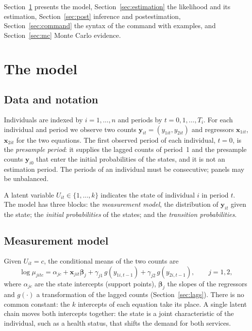 \documentclass[11pt,a4paper]{article}
\newcommand{\yv}{\mathbf y}
\newcommand{\xv}{\mathbf x}
\begin{document}
Section~\ref{sec:model} presents the model, Section~\ref{sec:estimation} the likelihood and its
estimation, Section~\ref{sec:post} inference and postestimation, Section~\ref{sec:command} the
syntax of the command with examples, and Section~\ref{sec:mc} Monte Carlo evidence.

\section{The model}\label{sec:model}

\subsection{Data and notation}

Individuals are indexed by $i=1,\dots,n$ and periods by $t=0,1,\dots,T_i$. For each individual and
period we observe two counts $\yv_{it}=(y_{1it},y_{2it})$ and regressors $\xv_{1it}$, $\xv_{2it}$ for
the two equations. The first observed period of each individual, $t=0$, is the \emph{presample
period}: it supplies the lagged counts of period~1 and the presample counts $\yv_{i0}$ that enter the
initial probabilities of the states, and it is not an estimation period. The periods of an individual
must be consecutive; panels may be unbalanced.

A latent variable $U_{it}\in\{1,\dots,k\}$ indicates the state of individual $i$ in period $t$. The
model has three blocks: the \emph{measurement model}, the distribution of $\yv_{it}$ given the state;
the \emph{initial probabilities} of the states; and the \emph{transition probabilities}.

\subsection{Measurement model}

Given $U_{it}=c$, the conditional means of the two counts are
\begin{equation}\label{eq:mean}
\log\mu_{jitc}=\alpha_{jc}+\xv_{jit}\bm\beta_j+\gamma_{j1}\,g(y_{1i,t-1})+\gamma_{j2}\,g(y_{2i,t-1}),
\qquad j=1,2,
\end{equation}
where $\alpha_{jc}$ are the state intercepts (support points), $\bm\beta_j$ the slopes of the
regressors and $g(\cdot)$ a transformation of the lagged counts (Section~\ref{sec:lags}). There is no
common constant: the $k$ intercepts of each equation take its place. A single latent chain moves both
intercepts together: the state is a joint characteristic of the individual, such as a health status,
that shifts the demand for both services.
\end{document}
